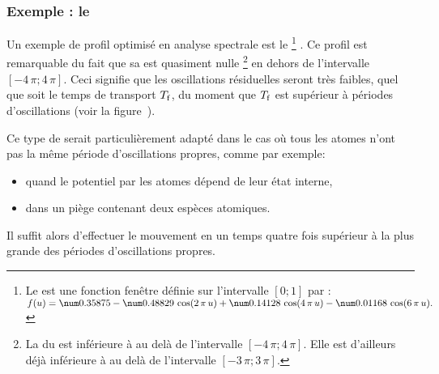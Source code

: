 \subsubsection{Exemple : le \pBH}
Un exemple de profil optimisé en analyse spectrale est le \pBH%
\footnote{Le \pBH est une fonction fenêtre définie sur l'intervalle $[0;1]$ par :\\$f(u)=\val{0.35875}-\val{0.48829}\,\cos(2\,\pi\,u)
+\val{0.14128}\,\cos(4\,\pi\,u)-\val{0.01168}\,\cos(6\,\pi\,u).
$}
\cite{Har78}. 
Ce profil est remarquable du fait que sa \tf est quasiment nulle%
\footnote{La \tf du \pBH est inférieure à  au delà de l'intervalle $[-4\,\pi ; 4\,\pi]$. Elle est d'ailleurs déjà inférieure à  au delà de l'intervalle $[-3\,\pi ; 3\,\pi]$.}
 en dehors de l'intervalle $[-4\,\pi ; 4\,\pi]$. 
Ceci signifie que les oscillations résiduelles seront très faibles, quel que soit le temps de transport ${T_{\rm f}}$, du moment que ${T_{\rm f}}$ est supérieur à  périodes d'oscillations (voir la figure~).
\bfighs
{}\\
\RemonteUnPeuFig
\RemonteUnPeuFig
\RemonteUnPeuFig
{}
\label{fig:MonsterProfilDeplacementHB}
\efigh


Ce type de \pacc serait particulièrement adapté dans le cas où tous les atomes n'ont pas la même période d'oscillations propres, comme par exemple:
\begin{itemize}
	\item quand le potentiel  par les atomes dépend de leur état interne,	
	\item dans un piège contenant deux espèces atomiques.
\end{itemize}
Il suffit alors d'effectuer le mouvement en un temps quatre fois supérieur à la plus grande des périodes d'oscillations propres.


